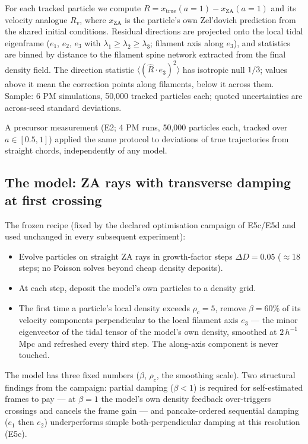\documentclass[11pt]{article}
\begin{document}
For each tracked particle we compute $R = x_{\mathrm{true}}(a{=}1) - x_{\mathrm{ZA}}(a{=}1)$ and its velocity analogue $R_v$, where $x_{\mathrm{ZA}}$ is the particle's own Zel'dovich prediction from the shared initial conditions. Residual directions are projected onto the local tidal eigenframe ($e_1$, $e_2$, $e_3$ with $\lambda_1 \geq \lambda_2 \geq \lambda_3$; filament axis along $e_3$), and statistics are binned by distance to the filament spine network extracted from the final density field. The direction statistic $\langle(\hat{R}\cdot e_3)^2\rangle$ has isotropic null $1/3$; values above it mean the correction points along filaments, below it across them. Sample: 6 PM simulations, 50,000 tracked particles each; quoted uncertainties are across-seed standard deviations.

A precursor measurement (E2; 4 PM runs, 50,000 particles each, tracked over $a \in [0.5, 1]$) applied the same protocol to deviations of true trajectories from straight chords, independently of any model.

\subsection{The model: ZA rays with transverse damping at first crossing}
\label{sec:model}

The frozen recipe (fixed by the declared optimisation campaign of E5c/E5d and used unchanged in every subsequent experiment):

\begin{itemize}
\item Evolve particles on straight ZA rays in growth-factor steps $\Delta D = 0.05$ ($\approx$18 steps; no Poisson solves beyond cheap density deposits).
\item At each step, deposit the model's own particles to a density grid.
\item The first time a particle's local density exceeds $\rho_c = 5$, remove {\boldmath$\beta = 60\%$} of its velocity components perpendicular to the local filament axis $e_3$ --- the minor eigenvector of the tidal tensor of the model's own density, smoothed at $2\,h^{-1}$Mpc and refreshed every third step. The along-axis component is never touched.
\end{itemize}

The model has three fixed numbers ($\beta$, $\rho_c$, the smoothing scale). Two structural findings from the campaign: partial damping ($\beta < 1$) is required for self-estimated frames to pay --- at $\beta = 1$ the model's own density feedback over-triggers crossings and cancels the frame gain --- and pancake-ordered sequential damping ($e_1$ then $e_2$) underperforms simple both-perpendicular damping at this resolution (E5c).
\end{document}
